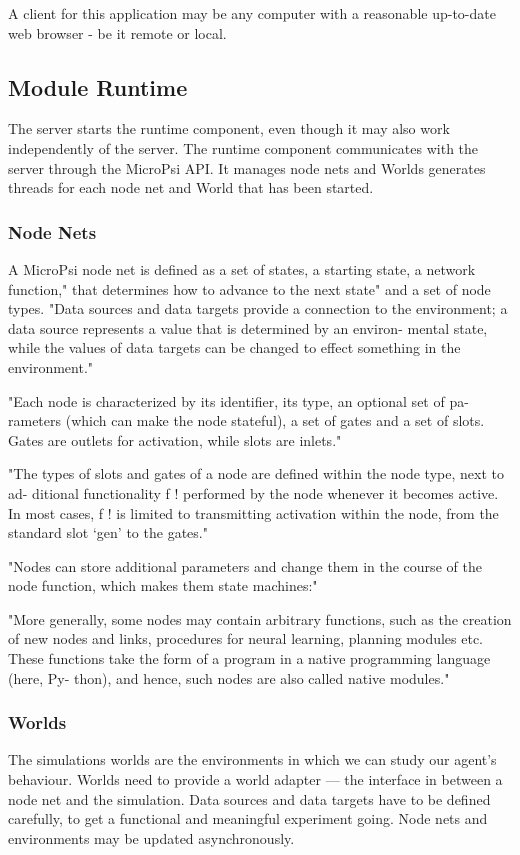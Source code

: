 A client for this application may be any computer with a reasonable up-to-date web browser - be it remote or local.
 
    
        \subsection{Module Runtime}
The server starts the runtime component, even though it may also work independently of the server. The runtime component communicates with the server through the MicroPsi API. It manages node nets and Worlds generates threads for each node net and World that has been started.

        \subsubsection{Node Nets}
A MicroPsi node net is defined as a set of states, a starting state, a network function," that determines how to advance to the next state" and a set of node types. "Data sources and data targets provide a connection to the environment; a data source represents a value that is determined by an environ- mental state, while the values of data targets can be changed to effect something in the environment."

"Each node is characterized by its identifier, its type, an optional set of pa- rameters (which can make the node stateful), a set of gates and a set of slots. Gates are outlets for activation, while slots are inlets."

"The types of slots and gates of a node are defined within the node type, next to ad- ditional functionality f ! performed by the node whenever it becomes active. In most cases, f ! is limited to transmitting activation within the node, from the standard slot ‘gen’ to the gates."

"Nodes can store additional parameters and change them in the course of the node function, which makes them state machines:"

"More generally, some nodes may contain arbitrary functions, such as the creation of new nodes and links, procedures for neural learning, planning modules etc. These functions take the form of a program in a native programming language (here, Py- thon), and hence, such nodes are also called native modules."



        \subsubsection{Worlds}
The simulations worlds are the environments in which we can study our agent's behaviour. Worlds need to provide a world adapter --- the interface in between a node net and the simulation. Data sources and data targets have to be defined carefully, to get a functional and meaningful experiment going. Node nets and environments may be updated asynchronously.~\cite{conf/agi/Bach12}

